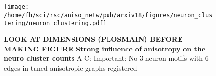 

\begin{figure}[ht]
\texttt{[image: /home/fh/sci/rsc/aniso\_netw/pub/arxiv18/figures/neuron\_clustering/neuron\_clustering.pdf]}
\caption{{\bf LOOK AT DIMENSIONS (PLOSMAIN) BEFORE MAKING FIGURE Strong influence of anisotropy on the neuro cluster counts}
A-C: Important: No 3 neuron motifs with 6 edges in tuned anisotropic
graphs registered}
\label{fig_cluster}%
\end{figure}
